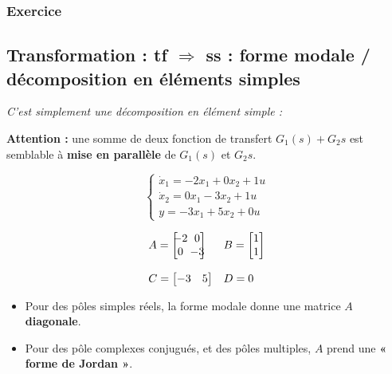 \documentclass[document.tex]{subfiles}
\begin{document}
\subsubsection{Exercice}


\subsection{Transformation : tf $\Rightarrow$ ss : forme modale / décomposition en éléments simples}

\textit{C'est simplement une décomposition en élément simple :}\\


\textbf{Attention :} une somme de deux fonction de transfert $G_1(s) + G_2{s}$ est semblable à \textbf{mise en parallèle} de $G_1(s)$ et $G_2{s}$.

\begin{equation}
\begin{cases}
	\dot{x}_1 = -2x_1 + 0x_2 + 1u \\
	\dot{x}_2 = 0x_1 - 3x_2 + 1u \\
	y = -3x_1 + 5x_2 + 0u
\end{cases}
\end{equation}

\begin{equation}
\begin{array}{l l}
A = \begin{bmatrix}
	 \tikzmark{top}{-2} & 0 \\ 0 & \tikzmark{bottom}{-3}
\end{bmatrix} & B = \begin{bmatrix} 1 \\ 1 \end{bmatrix} \\[18pt]
C = \begin{bmatrix} -3 & 5 \end{bmatrix} & D = 0
\end{array}
\end{equation}



\begin{itemize}
\item Pour des pôles simples réels, la forme modale donne une matrice $A$ \textbf{diagonale}.
\item Pour des pôle complexes conjugués, et des pôles multiples, $A$ prend une  \textbf{« forme de Jordan »}.
\end{itemize}
\end{document}
